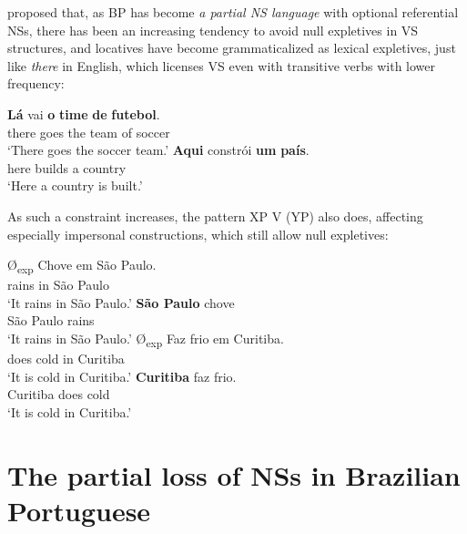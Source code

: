\documentclass[output=paper,colorlinks,citecolor=brown]{langscibook}
\begin{document}
   \z
\z

\citet{buthers2012} proposed that, as BP has become \textit{a partial NS language} with optional referential NSs, there has been an increasing tendency to avoid null expletives in VS structures, and locatives have become grammaticalized as lexical expletives, just like \emph{there} in English, which licenses VS even with transitive verbs with lower frequency:

\ea\label{ex:03:kato:10}%
   \ea\label{ex:03:kato:10a}
 \gll \textbf{Lá}    vai     \textbf{o}  \textbf{time} \textbf{de} \textbf{futebol}. \\
          there goes  the team of soccer \\
         \glt ‘There goes the soccer team.’
   \ex\label{ex:03:kato:10b}
 \gll \textbf{Aqui} constrói \textbf{um} \textbf{país}.\\
           here  builds     a    country\\
         \glt ‘Here a country is built.’
   \z
\z

As such a constraint increases, the pattern XP V (YP) also does, affecting especially impersonal constructions, which still allow null expletives:

\ea\label{ex:03:kato:11} %
   \ea\label{ex:03:kato:11a}
 \gll Ø\textsubscript{exp} Chove em São Paulo. \\
        {}  rains  in   São Paulo \\
         \glt ‘It rains in São Paulo.’
   \ex\label{ex:03:kato:11b}
 \gll \textbf{São Paulo} chove\\
           {São Paulo} rains\\
         \glt ‘It rains in São Paulo.’
   \ex\label{ex:03:kato:11c}
 \gll Ø\textsubscript{exp} Faz frio em Curitiba.\\
          {} does cold in Curitiba\\
         \glt ‘It is cold in Curitiba.’
   \ex\label{ex:03:kato:11d}
 \gll \textbf{Curitiba} faz frio. \\
           Curitiba does cold\\
         \glt ‘It is cold in Curitiba.’
   \z
\z

\section{The partial loss of NSs in Brazilian Portuguese}\label{03:sec:kato:3}
\end{document}
